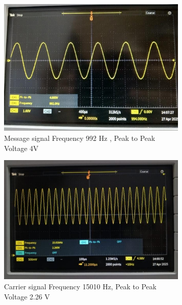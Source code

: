 \documentclass[a4paper,12pt]{article}
\begin{document}
\newpage
	\begin{figure}[H]
	\centering
	
	
	\begin{subfigure}[t]{0.49\textwidth}
		\centering
		\includegraphics[width=1\linewidth]{Images/9}
		\caption{Message signal Frequency 992 Hz   ,                                    Peak to Peak Voltage 4V 
		}
	\end{subfigure}
	\hfil
	\begin{subfigure}[t]{0.49\textwidth}
		\centering
		\includegraphics[width=1\linewidth]{Images/10}
		\caption{ Carrier signal Frequency 15010 Hz,               
		                                         Peak to Peak Voltage 2.26 V
		}
	\end{subfigure}
	\begin{subfigure}[t]{0.49\textwidth}

\end{subfigure}
\end{figure}
\end{document}
